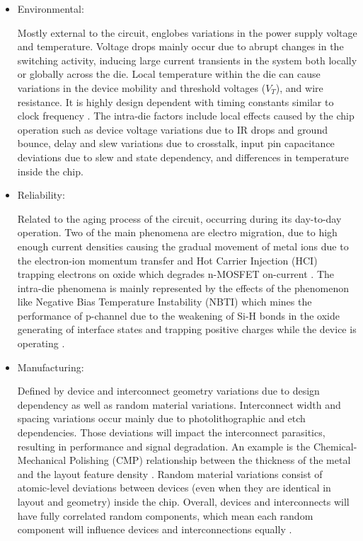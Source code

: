 \documentclass[diss,pgmicro,english]{iiufrgs}
\begin{document}
\begin{itemize}

\item Environmental:

		Mostly external to the circuit, englobes variations in the power supply voltage and temperature. Voltage drops mainly occur due to abrupt changes in the switching activity, inducing large current transients in the system both locally or globally across the die. Local temperature within the die can cause variations in the device mobility and threshold voltages ($V_T$), and wire resistance. It is highly design dependent with timing constants similar to clock frequency \cite{nassif:08} \cite{bernstein2006high}. The intra-die factors include local effects caused by the chip operation such as device voltage variations due to IR drops and ground bounce, delay and slew variations due to crosstalk, input pin capacitance deviations due to slew and state dependency, and differences in temperature inside the chip.

\item Reliability:

	Related to the aging process of the circuit, occurring during its day-to-day operation. Two of the main phenomena are electro migration, due to high enough current densities causing the gradual movement of metal ions due to the electron-ion momentum transfer \cite{young1994failure} \cite{posser2016electromigration} and Hot Carrier Injection (HCI) trapping electrons on oxide which degrades n-MOSFET on-current \cite{takeda1983empirical} \cite{nassif:08} \cite{bernstein2006high}. The intra-die phenomena is mainly represented by the effects of the phenomenon like Negative Bias Temperature Instability (NBTI) which mines the performance of p-channel due to the weakening of Si-H bonds in the oxide generating of interface states and trapping positive charges while the device is operating \cite{wang2008statistical}.

\item Manufacturing:

Defined by device and interconnect geometry variations due to design dependency as well as random material variations. Interconnect width and spacing variations occur mainly due to photolithographic and etch dependencies. Those deviations will impact the interconnect parasitics, resulting in performance and signal degradation. An example is the Chemical-Mechanical Polishing (CMP) relationship between the thickness of the metal and the layout feature density \cite{stine1997analysis}.  Random material variations consist of atomic-level deviations between devices (even when they are identical in layout and geometry) inside the chip. Overall, devices and interconnects will have fully correlated random components, which mean each random component will influence devices and interconnections equally \cite{dietrich2011process}.


\end{itemize}
\end{document}
